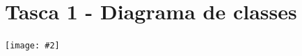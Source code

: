 \documentclass[a4paper,12pt]{article}
\makeatletter
\def\maxwidth#1{\ifdim\Gin@nat@width>#1 #1\else\Gin@nat@width\fi}
\newcommand{\mygraphic}[2][width=\maxwidth{\textwidth}]{\begin{center}
		\centering\texttt{[image: \#2]}\par
\end{center}}
\makeatother
\begin{document}

\section{Tasca 1 - Diagrama de classes}
\mygraphic{out/1.eps}
\end{document}
